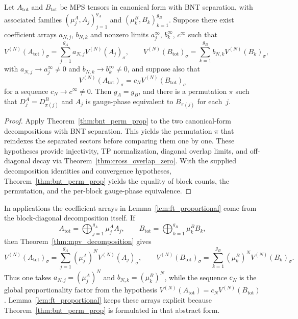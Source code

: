 \begin{lemma}\label{lem:ft_proportional}
	\leanok
	Let $A_{\mathrm{tot}}$ and $B_{\mathrm{tot}}$ be MPS tensors
	in canonical form with BNT separation, with associated families
	$(\mu_j^A, A_j)_{j=1}^{g_A}$ and $(\mu_k^B, B_k)_{k=1}^{g_B}$.
	Suppose there exist coefficient arrays $a_{N,j}$, $b_{N,k}$ and
	nonzero limits $a_j^\infty$, $b_k^\infty$, $c^\infty$ such that
	\[
		V^{(N)}(A_{\mathrm{tot}})_\sigma
		= \sum_{j=1}^{g_A} a_{N,j} V^{(N)}(A_j)_\sigma,
		\qquad
		V^{(N)}(B_{\mathrm{tot}})_\sigma
		= \sum_{k=1}^{g_B} b_{N,k} V^{(N)}(B_k)_\sigma,
	\]
	with $a_{N,j} \to a_j^\infty \neq 0$ and
	$b_{N,k} \to b_k^\infty \neq 0$, and suppose also that
	\[
		V^{(N)}(A_{\mathrm{tot}})_\sigma
		= c_N V^{(N)}(B_{\mathrm{tot}})_\sigma
	\]
	for a sequence $c_N \to c^\infty \neq 0$.
	Then $g_A = g_B$, and there is a permutation $\pi$ such that
	$D_j^A = D_{\pi(j)}^B$ and $A_j$ is gauge-phase equivalent to
	$B_{\pi(j)}$ for each~$j$.
\end{lemma}

\begin{proof}
	\leanok
	Apply Theorem~\ref{thm:bnt_perm_prop} to the two canonical-form
	decompositions with BNT separation.
	This yields the permutation $\pi$ that reindexes the separated sectors
	before comparing them one by one.
	These hypotheses provide injectivity, TP normalization,
	diagonal overlap limits, and off-diagonal decay via
	Theorem~\ref{thm:cross_overlap_zero}.
	With the supplied decomposition identities and convergence
	hypotheses, Theorem~\ref{thm:bnt_perm_prop} yields the equality of
	block counts, the permutation, and the per-block gauge-phase
	equivalence.
\end{proof}

\begin{remark}
	\label{rem:cf_coeff_arrays}
	In applications the coefficient arrays in
	Lemma~\ref{lem:ft_proportional} come from the block-diagonal
	decomposition itself. If
	\[
		A_{\mathrm{tot}} = \bigoplus_{j=1}^{g_A} \mu_j^A A_j,
		\qquad
		B_{\mathrm{tot}} = \bigoplus_{k=1}^{g_B} \mu_k^B B_k,
	\]
	then Theorem~\ref{thm:mpv_decomposition} gives
	\[
		V^{(N)}(A_{\mathrm{tot}})_\sigma
		= \sum_{j=1}^{g_A} (\mu_j^A)^N V^{(N)}(A_j)_\sigma,
		\qquad
		V^{(N)}(B_{\mathrm{tot}})_\sigma
		= \sum_{k=1}^{g_B} (\mu_k^B)^N V^{(N)}(B_k)_\sigma.
	\]
	Thus one takes $a_{N,j} = (\mu_j^A)^N$ and
	$b_{N,k} = (\mu_k^B)^N$, while the sequence $c_N$ is the global
	proportionality factor from the hypothesis
	$V^{(N)}(A_{\mathrm{tot}}) = c_N V^{(N)}(B_{\mathrm{tot}})$.
	Lemma~\ref{lem:ft_proportional} keeps these arrays explicit because
	Theorem~\ref{thm:bnt_perm_prop} is formulated in that abstract form.
\end{remark}

